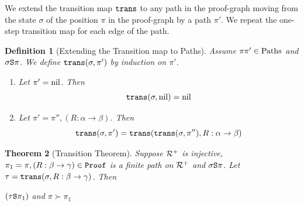 \documentclass{lmcs}
\newtheorem{theorem}{Theorem}[section]
\newtheorem{definition}[theorem]{Definition}
\begin{document}
We extend the transition map ${\tt trans}$ to any path in the proof-graph moving from the 
state $\sigma$ of the position
$\pi$ in the proof-graph by a path $\pi'$. 
We repeat the one-step transition map for each edge of the path.


\begin{definition}[Extending the Transition map to Paths]
\label{definition-extending-transition}
Assume $\pi\pi' \in {\rm Paths}$ and $\sigma {\tt S} \pi$.
We define ${\tt trans}(\sigma, \pi')$ by induction on $\pi'$. 
\begin{enumerate}

\item
Let $\pi'={{\rm nil}}$. Then
$$
{\tt trans}(\sigma,{{\rm nil}}) = {{\rm nil}}
$$

\item
Let $\pi'=\pi'', (R:\alpha \rightarrow \beta)$. Then
$$
{\tt trans}(\sigma,\pi') = {\tt trans}({\tt trans}(\sigma,\pi''),R:\alpha \rightarrow \beta)
$$

\end{enumerate}
\end{definition}



\begin{theorem}[Transition Theorem]
\label{theorem-transition}
Suppose ${\mathcal R}^+$ is injective, $\pi_1 = \pi, (R:\beta \rightarrow \gamma) \in {\tt Proof}$ 
is a finite path on ${\mathcal R}^+$ and  $\sigma {\tt S} \pi$. 
Let $\tau = {\tt trans}(\sigma,R:\beta \rightarrow \gamma) $. Then 
\begin{center}
$(\tau {\tt S} \pi_1)$
and $\pi \succ \pi_1$ 
\end{center}
\end{theorem}

\end{document}
